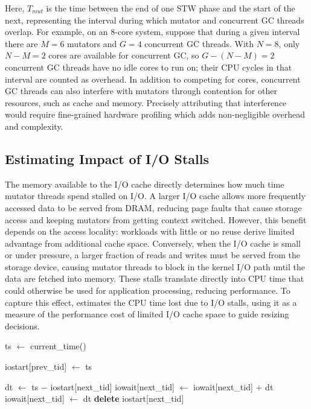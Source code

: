 Here, $T_\mathit{mut}$ is the time between the end of one STW phase and the start of the next, representing the interval during which mutator and concurrent GC threads overlap.
For example, on an 8-core system, suppose that during a given interval there are $M = 6$ mutators and $G = 4$ concurrent GC threads.
With $N = 8$, only $N - M = 2$ cores are available for concurrent GC, so $G - (N - M) = 2$ concurrent GC threads have no idle cores to run on; their CPU cycles in that interval are counted as overhead.
In addition to competing for cores, concurrent GC threads can also interfere with mutators through contention for other resources, such as cache and memory.
Precisely attributing that interference would require fine-grained hardware profiling which adds non-negligible overhead and complexity.

\subsection{Estimating Impact of I/O Stalls}
\label{sec:io_cost}
The memory available to the I/O cache directly determines how much time mutator threads spend stalled on I/O.
A larger I/O cache allows more frequently accessed data to be served from DRAM, reducing page faults that cause storage access and keeping mutators from getting context switched.
However, this benefit depends on the access locality: workloads with little or no reuse derive limited advantage from additional cache space.
Conversely, when the I/O cache is small or under pressure, a larger fraction of reads and writes must be served from the storage device, causing mutator threads to block in the kernel I/O path until the data are fetched into memory.
These stalls translate directly into CPU time that could otherwise be used for application processing, reducing performance.
To capture this effect, \flexheapName{} estimates the CPU time lost due to I/O stalls, using it as a measure of the performance cost of limited I/O cache space to guide resizing decisions.

\begin{algorithm}
	\caption{eBPF Handler for \texttt{sched\_switch}.}
	\begin{algorithmic}[1]
		\State ts $\gets$ current\_time()

		\State iostart[prev\_tid] $\gets$ ts
		\EndIf

		\State dt $\gets$ ts $-$ iostart[next\_tid]
		\State iowait[next\_tid] $\gets$ iowait[next\_tid] $+$ dt
		\Else
		\State iowait[next\_tid] $\gets$ dt
		\EndIf
		\State \textbf{delete} iostart[next\_tid]
		\EndIf
		\EndProcedure
	\end{algorithmic}
	\label{alg:ebpf}
\end{algorithm}

